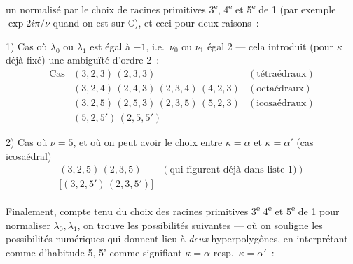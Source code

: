 \documentclass[11pt,a4paper]{article}
\begin{document}
un normalisé  par le choix de racines
primitives 3\textsuperscript{e}, 4\textsuperscript{e} et
5\textsuperscript{e} de 1 (par exemple $\exp 2i\pi/\nu$ quand on est sur
$\mathbb{C}$), et ceci pour deux raisons~:

1) Cas où $\lambda_0$ ou $\lambda_1$ est égal à $-1$, i.e.\ $\nu_0$ ou
$\nu_1$ égal 2 --- cela introduit (pour $\kappa$ déjà fixé) une ambiguïté
d'ordre 2~:
\[
\begin{array}{lll}
\text{Cas} & (3,2,3)\,(2,3,3) & (\text{tétraédraux}) \\
 & (3,2,4)\,(2,4,3)\,(2,3,4)\,(4,2,3) & (\text{octaédraux}) \\
 & (3,2,\underline{5})\,(2,5,3)\,(2,3,\underline{5})\,(5,2,3) & (\text{icosaédraux}) \\
 & (5,2,5')\,(2,5,5') &
\end{array}
\]

2) Cas où $\nu = 5$, et où on peut avoir le choix entre $\kappa = \alpha$ et
$\kappa = \alpha'$ (cas icosaédral)
\[
\begin{array}{ll}
(3,2,5)\,(2,3,5) & (\text{qui figurent déjà dans liste 1)}) \\
\bigl[(3,2,5')\,(2,3,5')\bigr] &
\end{array}
\]

Finalement, compte tenu du choix des racines primitives
3\textsuperscript{e} 4\textsuperscript{e} et 5\textsuperscript{e} de 1 pour
normaliser $\lambda_0, \lambda_1$, on trouve les possibilités suivantes ---
où on souligne les possibilités numériques qui donnent lieu à
\emph{deux} hyperpolygônes, en interprétant comme d'habitude 5, 5' comme
signifiant $\kappa = \alpha$ resp.\ $\kappa = \alpha'$~:
\end{document}
